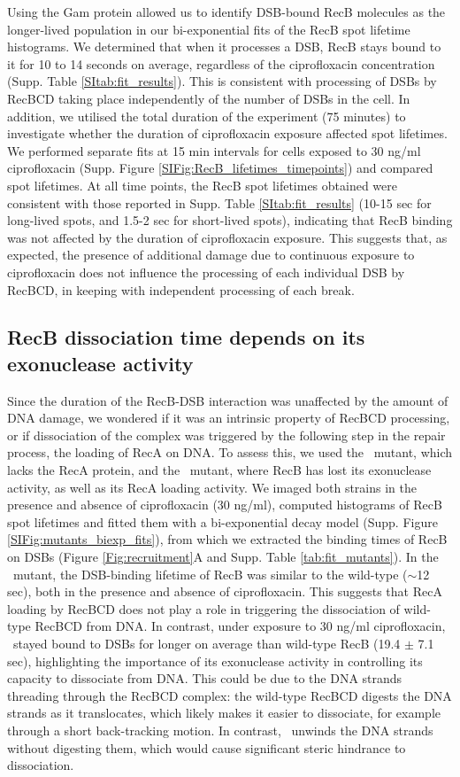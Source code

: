 Using the Gam protein allowed us to identify DSB-bound RecB molecules as the longer-lived population in our bi-exponential fits of the RecB spot lifetime histograms. We determined that when it processes a DSB, RecB stays bound to it for 10 to 14 seconds on average, regardless of the ciprofloxacin concentration (Supp. Table \ref{SItab:fit_results}). This is consistent with processing of DSBs by RecBCD taking place independently of the number of DSBs in the cell. In addition, we utilised the total duration of the experiment (75 minutes) to investigate whether the duration of ciprofloxacin exposure affected spot lifetimes. We performed separate fits at 15 min intervals for cells exposed to 30 ng/ml ciprofloxacin (Supp. Figure \ref{SIFig:RecB_lifetimes_timepoints}) and compared spot lifetimes. At all time points, the RecB spot lifetimes obtained were consistent with those reported in Supp. Table \ref{SItab:fit_results} (10-15 sec for long-lived spots, and 1.5-2 sec for short-lived spots), indicating that RecB binding was not affected by the duration of ciprofloxacin exposure. This suggests that, as expected, the presence of additional damage due to continuous exposure to ciprofloxacin does not influence the processing of each individual DSB by RecBCD, in keeping with independent processing of each break.

\subsection*{RecB dissociation time depends on its exonuclease activity}
Since the duration of the RecB-DSB interaction was unaffected by the amount of DNA damage, we wondered if it was an intrinsic property of RecBCD processing, or if dissociation of the complex was triggered by the following step in the repair process, the loading of RecA on DNA. To assess this, we used the \dreca\ mutant, which lacks the RecA protein, and the \geneteneighty\ mutant, where RecB has lost its exonuclease activity, as well as its RecA loading activity. We imaged both strains in the presence and absence of ciprofloxacin (30 ng/ml), computed histograms of RecB spot lifetimes and fitted them with a bi-exponential decay model (Supp. Figure \ref{SIFig:mutants_biexp_fits}), from which we extracted the binding times of RecB on DSBs (Figure \ref{Fig:recruitment}A and Supp. Table \ref{tab:fit_mutants}). In the \dreca\ mutant, the DSB-binding lifetime of RecB was similar to the wild-type ($\sim$12 sec), both in the presence and absence of ciprofloxacin. This suggests that RecA loading by RecBCD does not play a role in triggering the dissociation of wild-type RecBCD from DNA. In contrast, under exposure to 30 ng/ml ciprofloxacin, \teneighty\ stayed bound to DSBs for longer on average than wild-type RecB (19.4 $\pm$ 7.1 sec), highlighting the importance of its exonuclease activity in controlling its capacity to dissociate from DNA. This could be due to the DNA strands threading through the RecBCD complex: the wild-type RecBCD digests the DNA strands as it translocates, which likely makes it easier to dissociate, for example through a short back-tracking motion. In contrast, \teneighty\ unwinds the DNA strands without digesting them, which would cause significant steric hindrance to dissociation.

